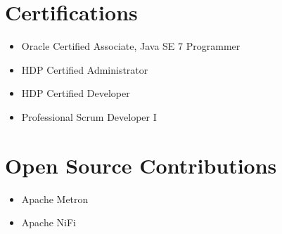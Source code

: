 \documentclass[margin]{res}
\begin{document}
\begin{resume}
 \section{Certifications}
\begin{itemize} \itemsep -2pt
\item Oracle Certified Associate, Java SE 7 Programmer
\item HDP Certified Administrator
\item HDP Certified Developer
\item Professional Scrum Developer I
\end{itemize}

\section{Open Source Contributions}
\begin{itemize} \itemsep -2pt
\item Apache Metron
\item Apache NiFi
\end{itemize}

\end{resume} 
\end{document}

